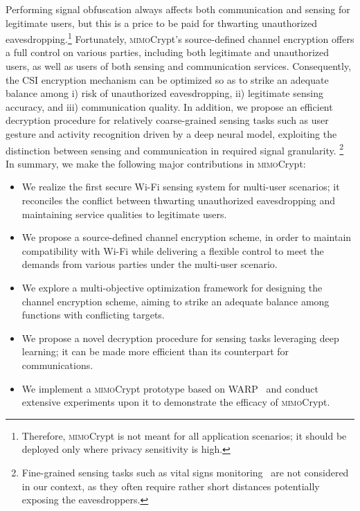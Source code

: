 \documentclass[conference,compsoc]{IEEEtran}
\newcommand{\name}{\textsc{mimo}Crypt\xspace}
\newcommand{\sname}{\textsc{mimo}Crypt\xspace}
\begin{document}
Performing signal obfuscation always affects both communication and sensing for legitimate users, but this is a price to be paid for thwarting unauthorized eavesdropping.\footnote{Therefore, \sname is not meant for all application scenarios; it should be deployed only where privacy sensitivity is high.}  
%
Fortunately, \sname's source-defined channel encryption offers a full control on various parties, including both legitimate and unauthorized users, as well as users of both sensing and communication services. Consequently, the CSI encryption mechanism can be optimized so as to strike an adequate balance among i) risk of unauthorized eavesdropping, ii) legitimate sensing accuracy, and iii) communication quality. 
In addition, we propose an efficient decryption procedure for relatively coarse-grained sensing tasks such as user gesture and activity recognition driven by a deep neural model, exploiting the distinction between sensing and communication in required signal granularity.
\footnote{Fine-grained sensing tasks such as vital signs monitoring~\cite{chen2021movifi} are not considered in our context, as they often require rather short distances potentially exposing the eavesdroppers.}
In summary, we make the following major contributions in \sname:
%
\begin{itemize}
%
    \item We realize the first secure Wi-Fi sensing system for multi-user scenarios; it reconciles the conflict between thwarting unauthorized eavesdropping and maintaining service qualities to legitimate users.
    \item We propose a source-defined channel encryption scheme, in order to maintain compatibility with Wi-Fi while delivering a flexible control to meet the demands from various parties under the multi-user scenario.
    \item We explore a multi-objective optimization framework for designing the channel encryption scheme, aiming to strike an adequate balance among functions with conflicting targets.
    \item We propose a novel decryption procedure for sensing tasks leveraging deep learning; it can be made more efficient than its counterpart for communications.
    \item We implement a \sname prototype based on WARP~\cite{WARP-web} and conduct extensive experiments upon it to demonstrate the efficacy of \name.
\end{itemize}
\end{document}
